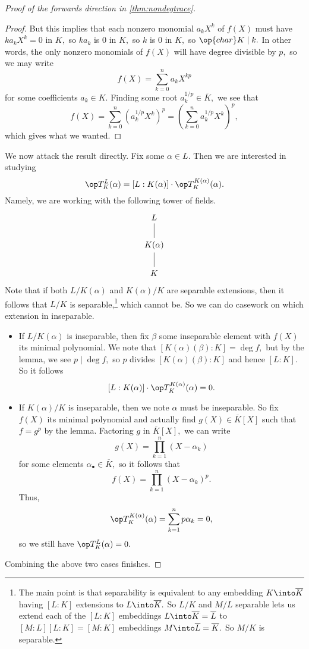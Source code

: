 \begin{proof}[Proof of the forwards direction in \autoref{thm:nondegtrace}]
\begin{proof}
		But this implies that each nonzero monomial $a_kX^k$ of $f(X)$ must have $ka_kX^k=0$ in $K,$ so $ka_k$ is $0$ in $K,$ so $k$ is $0$ in $K,$ so $\op{char}K\mid k.$ In other words, the only nonzero monomials of $f(X)$ will have degree divisible by $p,$ so we may write
		\[f(X)=\sum_{k=0}^na_kX^{kp}\]
		for some coefficients $a_k\in K.$ Finding some root $a_k^{1/p}\in\overline K,$ we see that
		\[f(X)=\sum_{k=0}^n\left(a_k^{1/p}X^k\right)^p=\left(\sum_{k=0}^na_k^{1/p}X^k\right)^p,\]
		which gives what we wanted.
	\end{proof}
	We now attack the result directly. Fix some $\alpha\in L.$ Then we are interested in studying
	\[\op T^L_K(\alpha)=[L:K(\alpha)]\cdot\op T_K^{K(\alpha)}(\alpha).\]
	Namely, we are working with the following tower of fields.
	\[\begin{tikzcd}
		L \\
		{K(\alpha)} \\
		K
		\arrow[no head, from=1-1, to=2-1]
		\arrow[no head, from=2-1, to=3-1]
	\end{tikzcd}\]
	Note that if both $L/K(\alpha)$ and $K(\alpha)/K$ are separable extensions, then it follows that $L/K$ is separable,\footnote{The main point is that separability is equivalent to any embedding $K\into\overline K$ having $[L:K]$ extensions to $L\into\overline K.$ So $L/K$ and $M/L$ separable lets us extend each of the $[L:K]$ embeddings $L\into\overline K=\overline L$ to $[M:L][L:K]=[M:K]$ embeddings $M\into\overline L=\overline K.$ So $M/K$ is separable.} which cannot be. So we can do casework on which extension in inseparable.
	\begin{itemize}
		\item If $L/K(\alpha)$ is inseparable, then fix $\beta$ some inseparable element with $f(X)$ its minimal polynomial. We note that $[K(\alpha)(\beta):K]=\deg f,$ but by the lemma, we see $p\mid\deg f,$ so $p$ divides $[K(\alpha)(\beta):K]$ and hence $[L:K].$ So it follows
		\[[L:K(\alpha)]\cdot\op T_K^{K(\alpha)}(\alpha)=0.\]
		\item If $K(\alpha)/K$ is inseparable, then we note $\alpha$ must be inseparable. So fix $f(X)$ its minimal polynomial and actually find $g(X)\in\overline K[X]$ such that $f=g^p$ by the lemma. Factoring $g$ in $\overline K[X],$ we can write
		\[g(X)=\prod_{k=1}^n(X-\alpha_k)\]
		for some elements $\alpha_\bullet\in\overline K,$ so it follows that
		\[f(X)=\prod_{k=1}^n(X-\alpha_k)^p.\]
		Thus,
		\[\op T^{K(\alpha)}_K(\alpha)=\sum_{k=1}^np\alpha_k=0,\]
		so we still have $\op T^L_K(\alpha)=0.$
	\end{itemize}
	Combining the above two cases finishes.
\end{proof}

